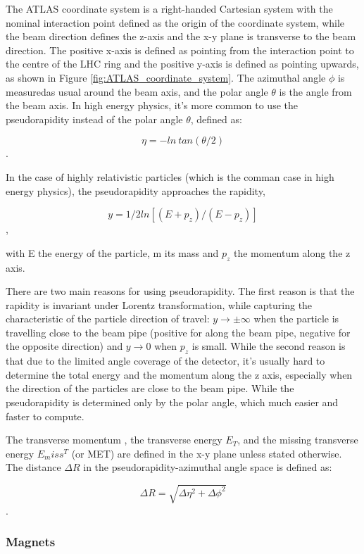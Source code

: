 \documentclass[letterpaper,12pt]{article}
\begin{document}
	The ATLAS coordinate system is a right-handed Cartesian system
	with the nominal interaction point 
	defined as the origin of the coordinate system,  
	while the beam direction defines the z-axis and 
	the x-y plane is transverse to the beam direction.  
	The positive x-axis is defined as pointing from 
	the interaction point to the centre of the
	LHC ring and the positive y-axis is defined as 
	pointing upwards, as shown in Figure \ref{fig:ATLAS_coordinate_system}. 
	The azimuthal angle $\phi$ 
	is measuredas usual around the beam axis, and 
	the polar angle $\theta$ is the angle from the beam axis.  
	In high energy physics, it's more common to use the 
	pseudorapidity instead of the
	polar angle $\theta$, defined as:

	\[ \eta = -ln\ tan(\theta/2) \].

	In the case of highly relativistic particles
	(which is the comman case in high energy physics), 
	the pseudorapidity approaches the rapidity, 

	\[ y=1/2ln[(E+p_z)/(E-p_z)] \],

	with E the energy of the particle, m its mass 
	and $p_z$ the momentum along the z axis.

	There are two main reasons for using pseudorapidity.
	The first reason is that the rapidity is invariant
	under Lorentz transformation, while capturing 
	the characteristic of the particle direction of travel:
	$y \rightarrow \pm \infty $ when the particle is  
	travelling close to the beam pipe (positive for along the
	beam pipe, negative for the opposite direction) and
	$y \rightarrow 0$ when $p_z$ is small.
	While the second reason is that due to the limited
	angle coverage of the detector, it's usually hard
	to determine the total energy and the momentum 
	along the z axis, especially when the direction of 
	the particles are close to the beam pipe. 
	While the pseudorapidity is determined only by
	the polar angle, which much easier and faster 
	to compute. 

	The transverse momentum \pt, the transverse energy
	$E_T$, and the missing transverse energy $E_miss^T$ (or MET) 
	are defined in the x-y plane unless stated otherwise.  
	The distance $\Delta R$ in the pseudorapidity-azimuthal angle 
	space is defined as:

	\[\Delta R = \sqrt{\Delta \eta^2+\Delta\phi^2}\].

\subsubsection{Magnets}
	
\end{document}

